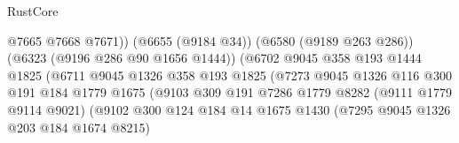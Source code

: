 \begin{lexlean}{RustCore}
\begin{coremodule}
                                                    @7665
                                                    @7668
                                                    @7671))
                                                (@6655 (@9184 @34))
                                                (@6580 (@9189 @263 @286))
                                                (@6323 (@9196 @286 @90 @1656 @1444))
                                                (@6702
                                                  @9045
                                                  @358
                                                  @193
                                                  @1444
                                                  @1825
                                                  (@6711
                                                    @9045
                                                    @1326
                                                    @358
                                                    @193
                                                    @1825
                                                    (@7273
                                                      @9045
                                                      @1326
                                                      @116
                                                      @300
                                                      @191
                                                      @184
                                                      @1779
                                                      @1675
                                                      (@9103
                                                        @309
                                                        @191
                                                        @7286
                                                        @1779
                                                        @8282
                                                        (@9111 @1779 @9114 @9021)
                                                        (@9102
                                                          @300
                                                          @124
                                                          @184
                                                          @14
                                                          @1675
                                                          @1430
                                                          (@7295 @9045 @1326 @203 @184 @1674 @8215)

\end{coremodule}
\end{lexlean}
